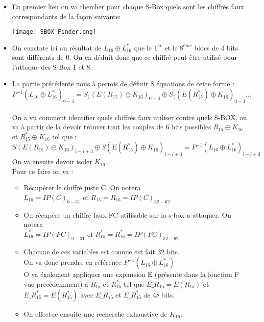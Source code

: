 \documentclass[a4paper,11pt]{article}
\begin{document}
	\begin{itemize}
		\item En premier lieu on va chercher pour chaque S-Box quels sont les chiffrés faux correspondants de la façon suivante:\\ 
		\begin{center}\texttt{[image: SBOX\_Finder.png]}\end{center}
		\item On constate ici au résultat de $L_{16} \oplus L_{16}^{*}$ que le $1^{er}$ et le $8^{ème}$ blocs de 4 bits sont différents de 0. On en déduit donc que ce chiffré peut être utilisé pour l'attaque des S-Box 1 et 8.
		\item La partie précédente nous à permis de définir 8 équations de cette forme :
		$$P^{-1} (L_{16} \oplus L_{16}^{*})_{0-3} = S_{1}(E(R_{15})\oplus K_{16})_{0-3} \oplus S_{1}(E(R_{15}^{*})\oplus K_{16})_{0-3}...$$\\
		On a vu comment identifier quels chiffrés faux utiliser contre quels S-BOX, on va à partir de la devoir trouver tout les couples de 6 bits possibles $R_{15}\oplus K_{16}$ et $R_{15}^{*}\oplus K_{16}$ tel que :
		$$S(E(R_{15})\oplus K_{16})_{i-i+3} \oplus S(E(R_{15}^{*})\oplus K_{16})_{i-i+3} = P^{-1} (L_{16} \oplus L_{16}^{*})_{i-i+3}$$
		On va ensuite devoir isoler $K_{16}$.\\
		Pour ce faire on va :\\
		\begin{itemize}
			\item Récupérer le chiffré juste C. On notera\\ 
			$L_{16} = IP(C)_{0-31}$  et $ R_{15} = R_{16}  = IP(C)_{32-62}$\\
			\item On récupère un chiffré faux FC utilisable sur la s-box a attaquer. On notera \\
			 $L_{16}^{*} = IP(FC)_{0-31}$  et $ R_{15}^{*} = R_{16}^{*} = IP(FC)_{32-62}$\\
			\item Chacune de ces variables est connue est fait 32 bits.\\
			On va donc prendre en référence $P^{-1}(L_{16} \oplus L_{16}^{*})$\\
			O va également appliquer une expansion E (présente dans la fonction F vue précédemment) à $R_{15}$ et $R_{15}^{*}$ tel que $E\_R_{15} = E(R_{15})$ et $E\_R_{15}^{*} = E(R_{15}^{*})$ avec $E\_R_{15}$ et $E\_R_{15}^{*}$ de 48 bits.\\
			\item On effectue ensuite une recherche exhaustive de $K_{16}$.\\

\end{itemize}
\end{itemize}
\end{document}
